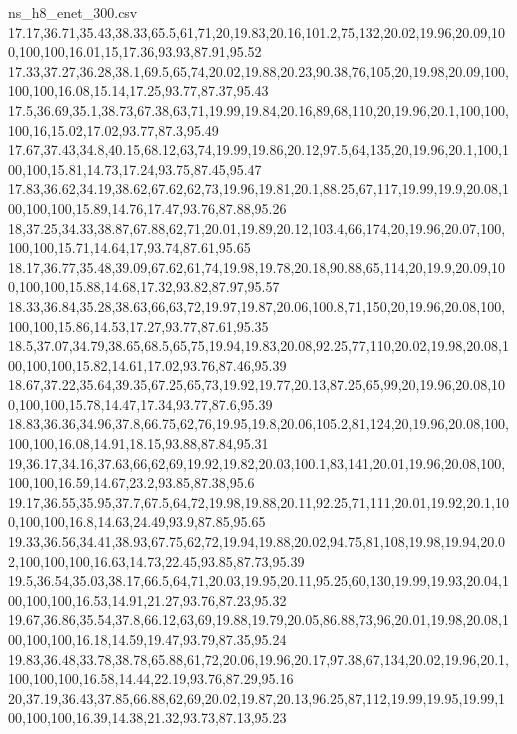 \begin{filecontents*}[overwrite]{ns_h8_enet_300.csv}
17.17,36.71,35.43,38.33,65.5,61,71,20,19.83,20.16,101.2,75,132,20.02,19.96,20.09,100,100,100,16.01,15,17.36,93.93,87.91,95.52
17.33,37.27,36.28,38.1,69.5,65,74,20.02,19.88,20.23,90.38,76,105,20,19.98,20.09,100,100,100,16.08,15.14,17.25,93.77,87.37,95.43
17.5,36.69,35.1,38.73,67.38,63,71,19.99,19.84,20.16,89,68,110,20,19.96,20.1,100,100,100,16,15.02,17.02,93.77,87.3,95.49
17.67,37.43,34.8,40.15,68.12,63,74,19.99,19.86,20.12,97.5,64,135,20,19.96,20.1,100,100,100,15.81,14.73,17.24,93.75,87.45,95.47
17.83,36.62,34.19,38.62,67.62,62,73,19.96,19.81,20.1,88.25,67,117,19.99,19.9,20.08,100,100,100,15.89,14.76,17.47,93.76,87.88,95.26
18,37.25,34.33,38.87,67.88,62,71,20.01,19.89,20.12,103.4,66,174,20,19.96,20.07,100,100,100,15.71,14.64,17,93.74,87.61,95.65
18.17,36.77,35.48,39.09,67.62,61,74,19.98,19.78,20.18,90.88,65,114,20,19.9,20.09,100,100,100,15.88,14.68,17.32,93.82,87.97,95.57
18.33,36.84,35.28,38.63,66,63,72,19.97,19.87,20.06,100.8,71,150,20,19.96,20.08,100,100,100,15.86,14.53,17.27,93.77,87.61,95.35
18.5,37.07,34.79,38.65,68.5,65,75,19.94,19.83,20.08,92.25,77,110,20.02,19.98,20.08,100,100,100,15.82,14.61,17.02,93.76,87.46,95.39
18.67,37.22,35.64,39.35,67.25,65,73,19.92,19.77,20.13,87.25,65,99,20,19.96,20.08,100,100,100,15.78,14.47,17.34,93.77,87.6,95.39
18.83,36.36,34.96,37.8,66.75,62,76,19.95,19.8,20.06,105.2,81,124,20,19.96,20.08,100,100,100,16.08,14.91,18.15,93.88,87.84,95.31
19,36.17,34.16,37.63,66,62,69,19.92,19.82,20.03,100.1,83,141,20.01,19.96,20.08,100,100,100,16.59,14.67,23.2,93.85,87.38,95.6
19.17,36.55,35.95,37.7,67.5,64,72,19.98,19.88,20.11,92.25,71,111,20.01,19.92,20.1,100,100,100,16.8,14.63,24.49,93.9,87.85,95.65
19.33,36.56,34.41,38.93,67.75,62,72,19.94,19.88,20.02,94.75,81,108,19.98,19.94,20.02,100,100,100,16.63,14.73,22.45,93.85,87.73,95.39
19.5,36.54,35.03,38.17,66.5,64,71,20.03,19.95,20.11,95.25,60,130,19.99,19.93,20.04,100,100,100,16.53,14.91,21.27,93.76,87.23,95.32
19.67,36.86,35.54,37.8,66.12,63,69,19.88,19.79,20.05,86.88,73,96,20.01,19.98,20.08,100,100,100,16.18,14.59,19.47,93.79,87.35,95.24
19.83,36.48,33.78,38.78,65.88,61,72,20.06,19.96,20.17,97.38,67,134,20.02,19.96,20.1,100,100,100,16.58,14.44,22.19,93.76,87.29,95.16
20,37.19,36.43,37.85,66.88,62,69,20.02,19.87,20.13,96.25,87,112,19.99,19.95,19.99,100,100,100,16.39,14.38,21.32,93.73,87.13,95.23
\end{filecontents*}

\documentclass[11pt]{article}
\usepackage[margin=1in]{geometry}
\usepackage[T1]{fontenc}
\usepackage{listings}
\lstset{basicstyle=\ttfamily\footnotesize,frame=single,breaklines=true,columns=fullflexible,keepspaces=true}
\usepackage{booktabs}
\usepackage{float}
\usepackage{array}
\usepackage{pgfplots}
\usetikzlibrary{arrows.meta,decorations.pathreplacing,calc,shapes.geometric}
\pgfplotsset{compat=1.18}
\usepackage{hyperref}
\usepackage{xurl}
\emergencystretch=3em

